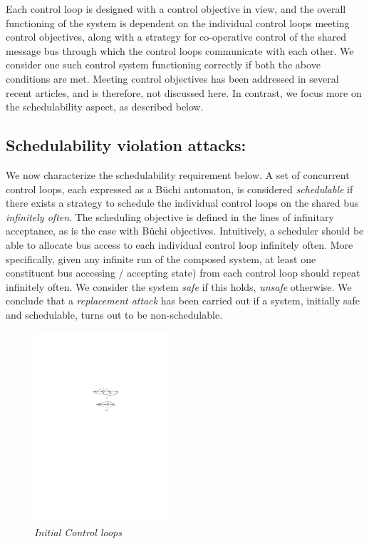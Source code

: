 \noindent
Each control loop is designed with a control objective in view, and the overall functioning of the system is dependent on the individual control loops meeting control objectives, along with a strategy for co-operative control of the shared message bus through which the control loops communicate with each other. We consider one such control system functioning correctly if both the above conditions are met. Meeting control objectives has been addressed in several recent articles, and is therefore, not discussed here. In contrast, we focus more on the schedulability aspect, as described below. 

\subsection{Schedulability violation attacks:} 
\noindent
We now characterize the schedulability requirement below. 
A set of concurrent control loops, each expressed as a B\"{u}chi automaton, is considered {\em schedulable} if there exists a strategy to schedule the individual control loops on the shared bus {\em infinitely often}.
The scheduling objective is defined in the lines of infinitary acceptance, as is the case with B\"{u}chi objectives. Intuitively, a scheduler should be able to allocate bus access to each individual control loop infinitely often. More specifically, given any infinite run of the composed system, at least one constituent  bus accessing / accepting state) from each control loop should repeat infinitely often. We consider the system {\em safe} if this holds, {\em unsafe} otherwise. We conclude that a {\em replacement attack} has been carried out if a system,  initially safe and schedulable, turns out to be non-schedulable. 

\begin{figure}
\begin{center}
\includegraphics[width=50mm]{motivating_example_automata.pdf}
\end{center}
\caption{{\em Initial Control loops}}
\label{state}
\end{figure}

